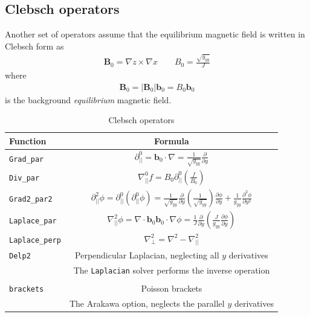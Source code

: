 \documentclass[12pt]{article}
\newcommand{\code}[1]{\texttt{#1}}
\newcommand{\deriv}[2]{\ensuremath{\frac{\partial #1}{\partial #2}}}
\begin{document}
\subsection{Clebsch operators}
Another set of operators assume that the equilibrium magnetic field is written
in Clebsch form as
%
%
\begin{align}
\mathbf{B}_0 = \nabla z\times\nabla x \qquad B_0 = \frac{\sqrt{g_{yy}}}{J}
\end{align}
%
where
%
\begin{align}
\mathbf{B}_0 = \left|\mathbf{B}_0\right|\mathbf{b}_0 = B_0 \mathbf{b}_0
\end{align}
%
is the background \emph{equilibrium} magnetic field.
%
\begin{table}[h!]
\centering
\caption{Clebsch operators}
%
\label{tab:clebsch_operators}
%
\begin{tabular}{l c}
\hline
Function & Formula \\
\hline
\code{Grad\_par} & $\displaystyle\partial^0_{||} = \mathbf{b}_0\cdot\nabla =
\frac{1}{\sqrt{g_{yy}}}\deriv{}{y}$ \\
\code{Div\_par} & $\displaystyle \nabla^0_{||}f =
B_0\partial^0_{||}\left(\frac{f}{B_0}\right)$ \\
\code{Grad2\_par2} & $\displaystyle \partial^2_{||}\phi =
\partial^0_{||}\left(\partial^0_{||}\phi\right) =
\frac{1}{\sqrt{g_{yy}}}\deriv{}{y}\left(\frac{1}{\sqrt{g_{yy}}}\right)\deriv{
\phi}{y} + \frac{1}{g_{yy}}\frac{\partial^2\phi}{\partial y^2}$ \\
\code{Laplace\_par} & $\displaystyle \nabla_{||}^2\phi =
\nabla\cdot\mathbf{b}_0\mathbf{b}_0\cdot\nabla\phi =
\frac{1}{J}\deriv{}{y}\left(\frac{J}{g_{yy}}\deriv{\phi}{y}\right)$ \\
\code{Laplace\_perp} & $\displaystyle \nabla_\perp^2 = \nabla^2 - \nabla_{||}^2$
\\
\code{Delp2} & Perpendicular Laplacian, neglecting all $y$ derivatives \\
             & The \code{Laplacian} solver performs the inverse operation \\
\\
\code{brackets} & Poisson brackets \\
                & The Arakawa option, neglects the parallel $y$ derivatives\\
\hline
\end{tabular}
%
\end{table}
%
\newpage
\end{document}

